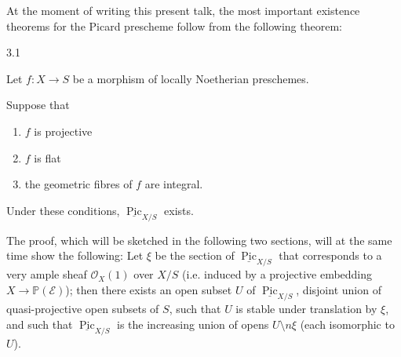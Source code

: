   At the moment of writing this present talk, the most important existence theorems for the Picard prescheme follow from the following theorem:\begin{theorem}{3.1}\label{fga3.v-3-theorem-3.1}\skipsinglepar\par{}Let \(f\colon  X\to  S\) be a morphism of locally Noetherian preschemes.
    
    Suppose that

    
 \begin{enumerate}
      
 \item[i.]
        \(f\) is projective
      

      
 \item[i.]
        \(f\) is flat
      

      
 \item[i.]
        the geometric fibres of \(f\) are integral.
      

    \end{enumerate}


    Under these conditions, \(\underline {\operatorname {Pic}}_{X/S}\) exists.\end{theorem}\par{}The proof, which will be sketched in the following two sections, will at the same time show the following:
  Let \(\xi \) be the section of \(\underline {\operatorname {Pic}}_{X/S}\) that corresponds to a very ample sheaf \(\mathcal {O}_X(1)\) over \(X/S\) (i.e. induced by a projective embedding \(X\to \mathbb {P}(\mathscr {E})\));
  then there exists an open subset \(U\) of \(\underline {\operatorname {Pic}}_{X/S}\), disjoint union of quasi-projective open subsets of \(S\), such that \(U\) is stable under translation by \(\xi \), and such that \(\underline {\operatorname {Pic}}_{X/S}\) is the increasing union of opens \(U\setminus  n\xi \) (each isomorphic to \(U\)).
